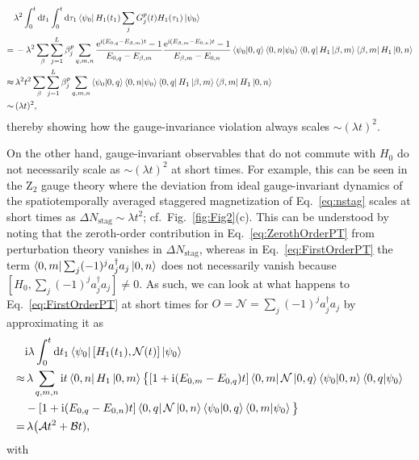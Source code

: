 \documentclass[aps,prl,reprint,twocolumn,superscriptaddress,floatfix,nofootinbib]{revtex4-1}
\def\d{\mathrm d}
\def\d{\mathrm d}
\begin{document}
\begin{align}\nonumber
&\lambda^2\int_0^t\d t_1\int_0^t\d \tau_1\bra{\psi_0}H_1(t_1)\sum_j G_j^p(t)H_1(\tau_1)\ket{\psi_0}\\\nonumber
=&\,-\lambda^2\sum_\beta\sum_{j=1}^L\beta_j^p\sum_{q,m,n}\frac{\mathrm{e}^{\mathrm{i}(E_{0,q}-E_{\beta,m})t}-1}{E_{0,q}-E_{\beta,m}}\frac{\mathrm{e}^{\mathrm{i}(E_{\beta,m}-E_{0,n})t}-1}{E_{\beta,m}-E_{0,n}}\bra{\psi_0}\ket{0,q}\bra{0,n}\ket{\psi_0}\bra{0,q}H_1\ket{\beta,m}\bra{\beta,m}H_1\ket{0,n}\\\nonumber
\approx&\,\lambda^2 t^2\sum_\beta\sum_{j=1}^L\beta_j^p\sum_{q,m,n}\bra{\psi_0}\ket{0,q}\bra{0,n}\ket{\psi_0}\bra{0,q}H_1\ket{\beta,m}\bra{\beta,m}H_1\ket{0,n}\\
\sim&\,(\lambda t)^2,
\end{align}
thereby showing how the gauge-invariance violation always scales $\sim(\lambda t)^2$. 

On the other hand, gauge-invariant observables that do not commute with $H_0$ do not necessarily scale as $\sim(\lambda t)^2$ at short times. For example, this can be seen in the $\mathrm{Z}_2$ gauge theory where the deviation from ideal gauge-invariant dynamics of the spatiotemporally averaged staggered magnetization of Eq.~\eqref{eq:nstag} scales at short times as $\Delta N_\text{stag}\sim\lambda t^2$; cf.~Fig.~\ref{fig:Fig2}(c). This can be understood by noting that the zeroth-order contribution in Eq.~\eqref{eq:ZerothOrderPT} from perturbation theory vanishes in $\Delta N_\text{stag}$, whereas in Eq.~\eqref{eq:FirstOrderPT} the term $\bra{0,m}\sum_j(-1)^ja_j^\dagger a_j\ket{0,n}$ does not necessarily vanish because $[H_0,\sum_j(-1)^j a_j^\dagger a_j]\neq0$. As such, we can look at what happens to Eq.~\eqref{eq:FirstOrderPT} at short times for $O=\mathcal{N}=\sum_j(-1)^ja_j^\dagger a_j$ by approximating it as
\begin{align}\nonumber
&\mathrm{i}\lambda\int_0^t\d t_1\bra{\psi_0}[H_1(t_1),\mathcal{N}(t)]\ket{\psi_0}\\\nonumber
\approx&\,\lambda\sum_{q,m,n}\mathrm{i}t\bra{0,n}H_1\ket{0,m}\big\{[1+\mathrm{i}(E_{0,m}-E_{0,q})t]\bra{0,m}\mathcal{N}\ket{0,q}\bra{\psi_0}\ket{0,n}\bra{0,q}\ket{\psi_0}\\\nonumber
&-[1+\mathrm{i}(E_{0,q}-E_{0,n})t]\bra{0,q}\mathcal{N}\ket{0,n}\bra{\psi_0}\ket{0,q}\bra{0,m}\ket{\psi_0}\big\}\\
=&\,\lambda \big(\mathcal{A}t^2+\mathcal{B}t),
\end{align}
with
\end{document}
